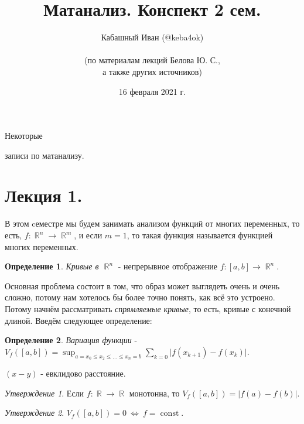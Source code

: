 \documentclass[a4paper,100pt]{article}
\title{Матанализ. Конспект 2 сем.}
\author{Кабашный Иван (@keba4ok)\\ \\ (по материалам лекций Белова Ю. С.,\\ а также других источников)}
\date{16 февраля 2021 г.}
\theoremstyle{indented}
\theoremstyle{definition}
\newtheorem{defn}{Определение}
\theoremstyle{remark}
\newtheorem{stat}{Утверждение}
\DeclareMathOperator{\RR}{\mathbb{R}}
\DeclareMathOperator{\const}{const}
\begin{document}
\newcommand{\resetexlcounters}{%
  \setcounter{exl}{0}%
} 

\newcommand{\resetremarkcounters}{%
  \setcounter{remark}{0}%
} 

\newcommand{\reseconscounters}{%
  \setcounter{cons}{0}%
} 

\newcommand{\resetall}{%
    \resetexlcounters
    \resetremarkcounters
    \reseconscounters%
}

\maketitle 

\newpage

\hypertarget{t1}{Некоторые} записи по матанализу.
\tableofcontents

\newpage


\section{Лекция 1.}

В этом cеместре мы будем занимать анализом функций от многих переменных, то есть,  $f:\RR^n\rightarrow \RR^m$,  и если $m=1$, то такая функция называется функцией многих переменных. \ 

\begin{defn}
    \textit{Кривые в $\RR^n$} - непрерывное отображение $f:[a, b]\rightarrow \RR^n$.
\end{defn}

Основная проблема состоит в том, что образ может выглядеть очень и очень сложно, потому нам хотелось бы более точно понять, как всё это устроено. Потому начнём рассматривать \textit{спрямляемые кривые}, то есть, кривые с конечной длиной. Введём следующее определение: 

\begin{defn}
    \textit{Вариация функции} - $V_f([a, b])=\sup_{a=x_0\leq x_2\leq \ldots\leq x_n=b} \sum_{k=0}\vert f(x_{k+1})-f(x_k)\vert$. 
\end{defn}

$(x-y)$ - евклидово расстояние.

\begin{stat}
    Если $f:\RR\rightarrow \RR$ монотонна, то $V_f([a, b])=\vert f(a)-f(b)\vert $.
\end{stat}

\begin{stat}
    $V_f([a, b])=0 \: \Leftrightarrow \: f=\const$.
\end{stat}
\end{document}
